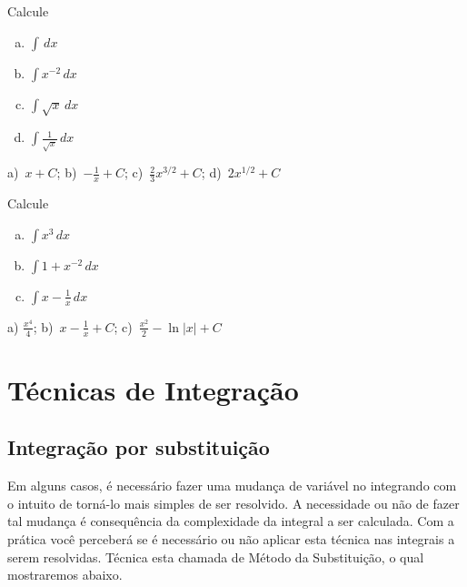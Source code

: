 \cleardoublepage\documentclass[../main.tex]{subfiles}
\begin{document}
\begin{exer}
  Calcule
  \begin{multicols}{4}
  \begin{enumerate}[a)]
  \item $\displaystyle \int \,dx$
  \item $\displaystyle \int x^{-2}\,dx$
  \item $\displaystyle \int \sqrt{x}\,dx$
  \item $\displaystyle \int \frac{1}{\sqrt{x}}\,dx$
  \end{enumerate}\end{multicols}
\end{exer}
\begin{resp}
  a)~$\displaystyle x + C$; b)~$\displaystyle -\frac{1}{x} + C$; c)~$\displaystyle \frac{2}{3}x^{3/2} + C$; d)~$\displaystyle 2x^{1/2} + C$
\end{resp}

\begin{exer}
  Calcule
   \begin{multicols}{3}
  \begin{enumerate}[a)]
  \item $\int x^3\,dx$
  \item $\displaystyle \int 1 + x^{-2}\,dx$
  \item $\displaystyle \int x - \frac{1}{x}\,dx$
    \end{enumerate}\end{multicols}
\end{exer}
\begin{resp}
 a) $\frac{x^4}{4}$; b)~$\displaystyle x-\frac{1}{x}+C$; c)~$\displaystyle \frac{x^2}{2} - \ln|x| + C$
\end{resp}

\section{Técnicas de Integração}
\subsection{Integração por substituição}\hypertarget{IntSubst}{}\label{sec:MetSubst}
Em alguns casos, é necessário fazer uma mudança de variável no integrando com o intuito de torná-lo mais simples de ser resolvido. A necessidade ou não de fazer tal mudança é consequência da complexidade da integral a ser calculada. Com a prática você perceberá se é necessário ou não aplicar esta técnica nas integrais a serem resolvidas. Técnica esta chamada de Método da Substituição, o qual mostraremos abaixo.
\end{document}
